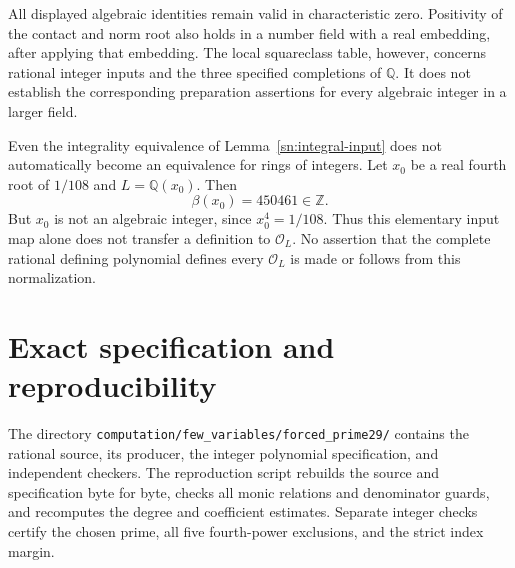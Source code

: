 \documentclass[11pt,a4paper]{article}
\theoremstyle{definition}
\theoremstyle{remark}
\begin{document}
All displayed algebraic identities remain valid in characteristic
zero.  Positivity of the contact and norm root also holds in a
number field with a real embedding, after applying that embedding.
The local squareclass table, however, concerns rational integer
inputs and the three specified completions of $\mathbb Q$.
It does not establish the corresponding preparation assertions
for every algebraic integer in a larger field.

Even the integrality equivalence of Lemma~\ref{sn:integral-input}
does not automatically become an equivalence for rings of
integers.  Let $x_0$ be a real fourth root of $1/108$ and
$L=\mathbb Q(x_0)$.  Then
\[
                       \beta(x_0)=450461\in\mathbb Z.
\]
But $x_0$ is not an algebraic integer, since $x_0^4=1/108$.
Thus this elementary input map
alone does not transfer a definition to $\mathcal O_L$.
No assertion that the complete rational defining polynomial
defines every $\mathcal O_L$ is made or follows from this
normalization.


\section{Exact specification and reproducibility}
The directory \texttt{computation/few\_variables/forced\_prime29/}
contains the rational source, its producer, the integer polynomial
specification, and independent checkers. The reproduction script
rebuilds the source and specification byte for byte, checks all monic
relations and denominator guards, and recomputes the degree and
coefficient estimates. Separate integer checks certify the chosen
prime, all five fourth-power exclusions, and the strict index margin.
\end{document}

